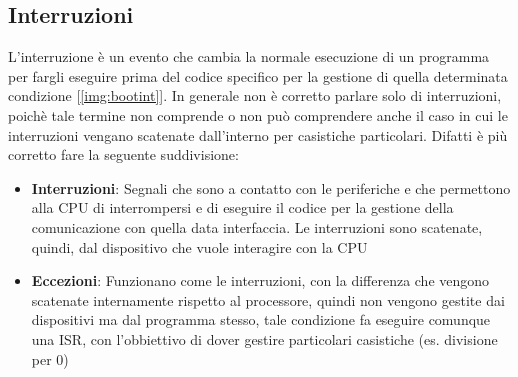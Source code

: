             

\subsection{Interruzioni}
L'interruzione è un evento che cambia la normale esecuzione di un programma per fargli eseguire prima del codice specifico per la gestione di quella determinata condizione [\ref{img:bootint}]. In generale non è corretto parlare solo di interruzioni, poichè tale termine non comprende o non può comprendere anche il caso in cui le interruzioni vengano scatenate dall'interno per casistiche particolari. Difatti è più corretto fare la seguente suddivisione:
\begin{itemize}
    \item \textbf{Interruzioni}: Segnali che sono a contatto con le periferiche e che permettono alla CPU di interrompersi e di eseguire il codice per la gestione della comunicazione con quella data interfaccia. Le interruzioni sono scatenate, quindi, dal dispositivo che vuole interagire con la CPU
    \item \textbf{Eccezioni}: Funzionano come le interruzioni, con la differenza che vengono scatenate internamente rispetto al processore, quindi non vengono gestite dai dispositivi ma dal programma stesso, tale condizione fa eseguire comunque una ISR, con l'obbiettivo di dover gestire particolari casistiche (es. divisione per 0)
\end{itemize}

